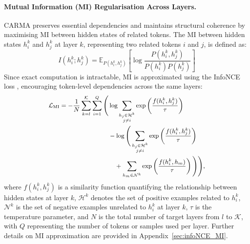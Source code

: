 \paragraph{Mutual Information (MI) Regularisation Across Layers.} CARMA preserves essential dependencies and maintains structural coherence by maximising MI between hidden states of related tokens. The MI between hidden states \( h^k_i \) and \( h^k_j \) at layer \( k \), representing two related tokens \( i \) and \( j \), is defined as:
\begin{equation} 
I(h^k_i; h^k_j) = \mathbb{E}_{P(h^k_i,h^k_j)}\left[\log \frac{P(h^k_i,h^k_j)}{P(h^k_i)P(h^k_j)}\right]
\end{equation}
Since exact computation is intractable, MI is approximated using the InfoNCE loss \cite{oord2018representation}, encouraging token-level dependencies across the same layers:
\begin{equation}
\small
\begin{aligned}
    \mathcal{L}_{\text{MI}} = - \frac{1}{N} \sum_{k=l}^{\mathcal{K}} \sum_{i=1}^Q \Bigg( 
    &\log \sum_{\substack{h_j \in \mathcal{H}^k \\ j \neq i}} \exp\left(\frac{f(h_i^k, h_j^k)}{\tau}\right) \\
    &- \log \Bigg( \sum_{\substack{h_j \in \mathcal{H}^k \\ j \neq i}} \exp\left(\frac{f(h_i^k, h_j^k)}{\tau}\right) \\
    &\quad + \sum_{h_m \in \mathcal{N}^k} \exp\left(\frac{f(h_i^k, h_m)}{\tau}\right) \Bigg) \Bigg),
\end{aligned}
\end{equation}
where \( f(h_i^k, h_j^k) \) is a similarity function quantifying the relationship between hidden states at layer \( k \), \( \mathcal{H}^k \) denotes the set of positive examples related to \( h_i^k \), \( \mathcal{N}^k \) is the set of negative examples unrelated to \( h_i^k \) at layer \( k \), \( \tau \) is the temperature parameter, and \( N \) is the total number of target layers from \( l \) to \( \mathcal{K} \), with \( Q \) representing the number of tokens or samples used per layer. Further details on MI approximation are provided in Appendix~\ref{sec:infoNCE_MI}.

